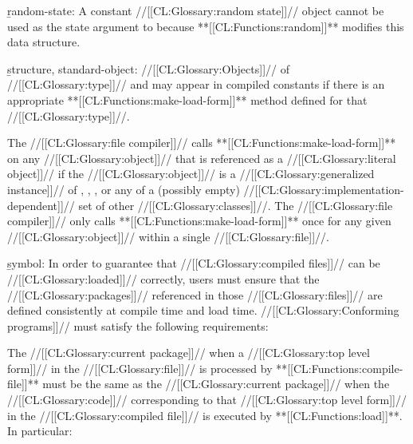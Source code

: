  \item{}\b{random-state:} A constant //[[CL:Glossary:random state]]//
object cannot be used as the state argument 
to  because **[[CL:Functions:random]]** modifies this data structure.
 
\item{}\b{structure, standard-object:}
//[[CL:Glossary:Objects]]// of //[[CL:Glossary:type]]//  and 
may appear in compiled constants if there is an
appropriate **[[CL:Functions:make-load-form]]** method defined for that
//[[CL:Glossary:type]]//.
 

















The //[[CL:Glossary:file compiler]]// calls **[[CL:Functions:make-load-form]]** on any //[[CL:Glossary:object]]//
that is referenced as a //[[CL:Glossary:literal object]]// if the //[[CL:Glossary:object]]// is a
//[[CL:Glossary:generalized instance]]// of ,
, , or any of a 
(possibly empty) //[[CL:Glossary:implementation-dependent]]// set of other //[[CL:Glossary:classes]]//.
The //[[CL:Glossary:file compiler]]// only calls **[[CL:Functions:make-load-form]]** once for
any given //[[CL:Glossary:object]]// within a single //[[CL:Glossary:file]]//.



 \item{}\b{symbol:} In order to guarantee that //[[CL:Glossary:compiled files]]// can be //[[CL:Glossary:loaded]]//
  correctly, users must ensure that the //[[CL:Glossary:packages]]// referenced in those //[[CL:Glossary:files]]//
  are defined consistently at compile time and load time.  //[[CL:Glossary:Conforming programs]]//
  must satisfy the following requirements:
  
\beginlist
{} The //[[CL:Glossary:current package]]// when a //[[CL:Glossary:top level form]]// in the //[[CL:Glossary:file]]//
      is processed by **[[CL:Functions:compile-file]]** must be the same as the //[[CL:Glossary:current package]]//
      when the //[[CL:Glossary:code]]// corresponding to that //[[CL:Glossary:top level form]]// in the
      //[[CL:Glossary:compiled file]]// is executed by **[[CL:Functions:load]]**.  In particular:

